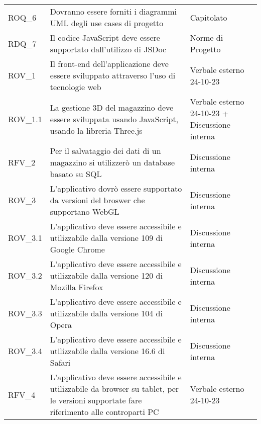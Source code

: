 \begin{xltabular}{\textwidth}{ p{0.2\textwidth} | X | p{0.2\textwidth} }
    ROQ\_6& Dovranno essere forniti i diagrammi UML degli use cases di progetto & Capitolato  \\
    RDQ\_7& Il codice JavaScript deve essere supportato dall'utilizzo di JSDoc & Norme di Progetto \\
    ROV\_1& Il front-end dell'applicazione deve essere sviluppato attraverso l'uso di tecnologie web & Verbale esterno 24-10-23 \\
    ROV\_1.1& La gestione 3D del magazzino deve essere sviluppata usando JavaScript, usando la libreria Three.js & Verbale esterno 24-10-23 + Discussione interna \\
    RFV\_2& Per il salvataggio dei dati di un magazzino si utilizzerò un database basato su SQL & Discussione interna\\
    ROV\_3& L'applicativo dovrò essere supportato da versioni del broswer che supportano WebGL & Discussione interna\\
    ROV\_3.1& L'applicativo deve essere accessibile e utilizzabile dalla versione 109 di Google Chrome & Discussione interna\\
    ROV\_3.2& L'applicativo deve essere accessibile e utilizzabile dalla versione 120 di Mozilla Firefox & Discussione interna\\
    ROV\_3.3& L'applicativo deve essere accessibile e utilizzabile dalla versione 104 di Opera & Discussione interna\\
    ROV\_3.4& L'applicativo deve essere accessibile e utilizzabile dalla versione 16.6 di Safari & Discussione interna\\
    RFV\_4& L'applicativo deve essere accessibile e utilizzabile da browser su tablet, per le versioni supportate fare riferimento alle controparti PC & Verbale esterno 24-10-23\\

    \hline
\end{xltabular}


\renewcommand{\arraystretch}{1.25}
